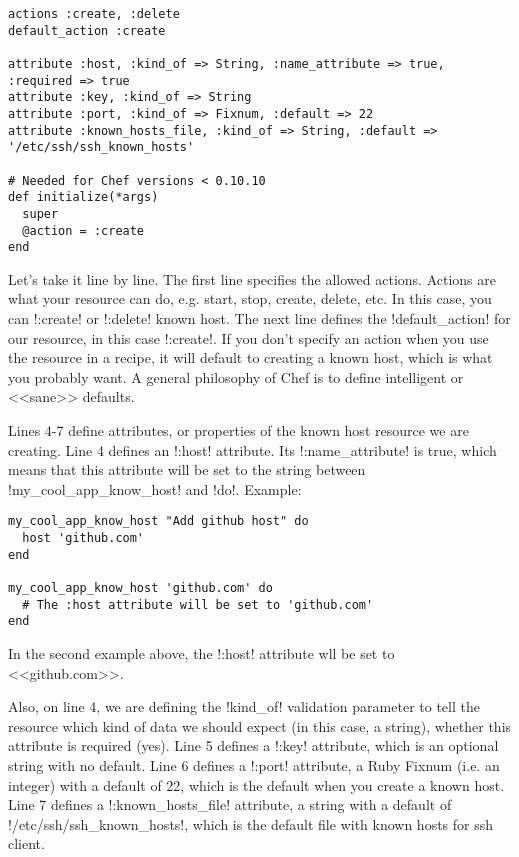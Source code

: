 \begin{lstlisting}[label=lst:cookbook-lwrp1,title=my-server-cloud/site-cookbooks/my\_cool\_app/resources/know\_host.rb]
actions :create, :delete
default_action :create

attribute :host, :kind_of => String, :name_attribute => true, :required => true
attribute :key, :kind_of => String
attribute :port, :kind_of => Fixnum, :default => 22
attribute :known_hosts_file, :kind_of => String, :default => '/etc/ssh/ssh_known_hosts'

# Needed for Chef versions < 0.10.10
def initialize(*args)
  super
  @action = :create
end
\end{lstlisting}

Let's take it line by line. The first line specifies the allowed actions. Actions are what your resource can do, e.g. start, stop, create, delete, etc. In this case, you can \inline!:create! or \inline!:delete! known host. The next line defines the \inline!default_action! for our resource, in this case \inline!:create!. If you don't specify an action when you use the resource in a recipe, it will default to creating a known host, which is what you probably want. A general philosophy of Chef is to define intelligent or <<sane>> defaults.

Lines 4-7 define attributes, or properties of the known host resource we are creating. Line 4 defines an \inline!:host! attribute. Its \inline!:name_attribute! is true, which means that this attribute will be set to the string between \inline!my_cool_app_know_host! and \inline!do!. Example:

\begin{lstlisting}[label=lst:cookbook-lwrp2]
my_cool_app_know_host "Add github host" do
  host 'github.com'
end

my_cool_app_know_host 'github.com' do
  # The :host attribute will be set to 'github.com'
end
\end{lstlisting}

In the second example above, the \inline!:host! attribute wll be set to <<github.com>>.

Also, on line 4, we are defining the \inline!kind_of! validation parameter to tell the resource which kind of data we should expect (in this case, a string), whether this attribute is required (yes). Line 5 defines a \inline!:key! attribute, which is an optional string with no default. Line 6 defines a \inline!:port! attribute, a Ruby Fixnum (i.e. an integer) with a default of 22, which is the default when you create a known host. Line 7 defines a \inline!:known_hosts_file! attribute, a string with a default of \inline!/etc/ssh/ssh_known_hosts!, which is the default file with known hosts for ssh client.


